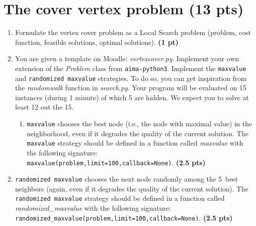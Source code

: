 \documentclass[11pt,a4paper]{report}
\begin{document}
\maketitle

\section{The cover vertex problem (13 pts)}

\begin{enumerate}
\item Formulate the vertex cover problem as a Local Search problem (problem, cost function, feasible solutions, optimal solutions). \textbf{(1 pt)}
\end{enumerate}

\begin{answers}[6cm]
\end{answers}


\begin{enumerate}
\setcounter{enumi}{1}
    \item You are given a template on Moodle: \textit{vertexcover.py}. Implement your own extension of the \textit{Problem} class from \texttt{aima-python3}. Implement the \texttt{maxvalue} and \texttt{randomized maxvalue} strategies. To do so,
	you can get inspiration from the \textit{randomwalk} function in \textit{search.py}. Your program will be evaluated on 15 instances (during 1 minute) of which 5 are hidden. We expect you to solve at least 12 out the 15.
    \begin{enumerate}
        \item \texttt{maxvalue} chooses the best node (i.e., the node with maximal
        value) in the neighborhood, even if it degrades the quality of the current solution. 
        The \texttt{maxvalue} strategy should be defined in a function called
        \textit{maxvalue} with the following signature: \\
        \texttt{maxvalue(problem,limit=100,callback=None)}. \textbf{(2.5 pts)}
    \end{enumerate}
\end{enumerate}

\begin{answers}[2.5 cm]
\end{answers}



\begin{enumerate}
\setcounter{enumi}{1}
\begin{enumerate}
\setcounter{enumii}{1}
    \item \texttt{randomized maxvalue} chooses the next node randomly among
        the 5~best neighbors (again, even if it degrades the quality of the current solution).
        The \texttt{randomized maxvalue} strategy should be defined in a function called
        \textit{randomized\_maxvalue} with the following signature: \\
        \texttt{randomized\_maxvalue(problem,limit=100,callback=None)}. \textbf{(2.5 pts)}
\end{enumerate}
\end{enumerate}
\end{document}
